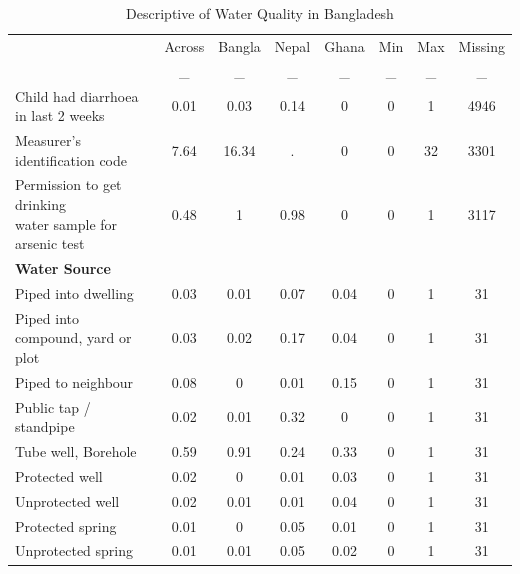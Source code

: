 \begin{table}[htbp]\centering
\def\sym#1{\ifmmode^{#1}\else\(^{#1}\)\fi}
\caption{Descriptive of Water Quality in Bangladesh \label{}}
\begin{tabular}{l*{7}{c}}
\hline\hline
                    &\multicolumn{1}{c}{Across}&\multicolumn{1}{c}{Bangla}&\multicolumn{1}{c}{Nepal}&\multicolumn{1}{c}{Ghana}&\multicolumn{1}{c}{Min}&\multicolumn{1}{c}{Max}&\multicolumn{1}{c}{Missing}\\
                    &           _&           _&           _&           _&           _&           _&           _\\
\hline
Child had diarrhoea in last 2 weeks&        0.01&        0.03&        0.14&        0 &        0 &        1 &     4946 \\
Measurer's identification code&        7.64&       16.34&           .&        0 &        0 &       32 &     3301 \\
\shortstack{Permission to get drinking\\water sample for arsenic test}&        0.48&        1 &        0.98&        0 &        0 &        1 &     3117 \\
\textbf{Water Source} \\\hline Piped into dwelling &        0.03&        0.01&        0.07&        0.04&        0 &        1 &       31 \\
Piped into compound, yard or plot&        0.03&        0.02&        0.17&        0.04&        0 &        1 &       31 \\
Piped to neighbour  &        0.08&        0 &        0.01&        0.15&        0 &        1 &       31 \\
Public tap / standpipe&        0.02&        0.01&        0.32&        0 &        0 &        1 &       31 \\
Tube well, Borehole &        0.59&        0.91&        0.24&        0.33&        0 &        1 &       31 \\
Protected well      &        0.02&        0 &        0.01&        0.03&        0 &        1 &       31 \\
Unprotected well    &        0.02&        0.01&        0.01&        0.04&        0 &        1 &       31 \\
Protected spring    &        0.01&        0 &        0.05&        0.01&        0 &        1 &       31 \\
Unprotected spring  &        0.01&        0.01&        0.05&        0.02&        0 &        1 &       31 \\

\end{tabular}
\end{table}
